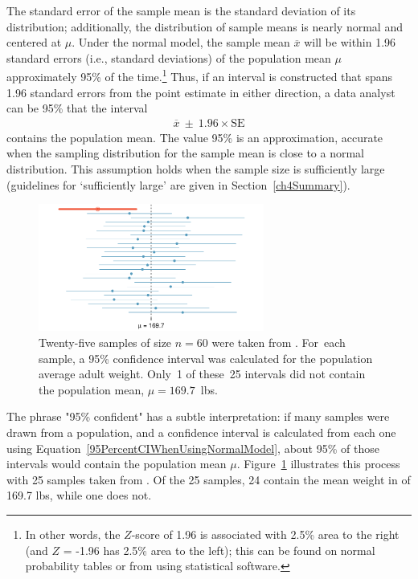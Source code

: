 The standard error of the sample mean is the standard deviation of its distribution; additionally, the distribution of sample means is nearly normal and centered at $\mu$. Under the normal model, the sample mean $\overline{x}$ will be within 1.96 standard errors (i.e., standard deviations) of the population mean $\mu$ approximately 95\% of the time.\footnote{In other words, the $Z$-score of 1.96 is associated with 2.5\% area to the right (and $Z$ = -1.96 has 2.5\% area to the left); this can be found on normal probability tables or from using statistical software.} Thus, if an interval is constructed that spans 1.96 standard errors from the point estimate in either direction, a data analyst can be 95\%  that the interval
\begin{align}
  \overline{x}\ \pm\ 1.96\times \text{SE} 
\label{95PercentCIWhenUsingNormalModel}
\end{align}
contains the population mean. The value 95\% is an approximation, accurate when the sampling distribution for the sample mean is close to a normal distribution. This assumption holds when the sample size is sufficiently large (guidelines for `sufficiently large' are given in Section~\ref{ch4Summary}).

\begin{figure}[h]
	\centering
	\includegraphics[width=0.66\textwidth]
	{ch_inference_foundations_oi_biostat/figures/95PercentConfidenceInterval/95PercentConfidenceInterval.pdf}
	\caption{Twenty-five samples of size $n=60$ were taken from . For~each sample, a 95\% confidence interval was calculated for the population average adult weight. Only~1 of these~25 intervals did not contain the population mean, $\mu = 169.7$~lbs.}
	\label{95PercentConfidenceInterval}
\end{figure}

The phrase "95\% confident" has a subtle interpretation: if many samples were drawn from a population, and a confidence interval is calculated from each one using Equation~\ref{95PercentCIWhenUsingNormalModel}, about 95\% of those intervals would contain the population mean $\mu$. Figure~\ref{95PercentConfidenceInterval} illustrates this process with 25 samples taken from . Of the 25 samples, 24 contain the mean weight in  of 169.7 lbs, while one does not. 

